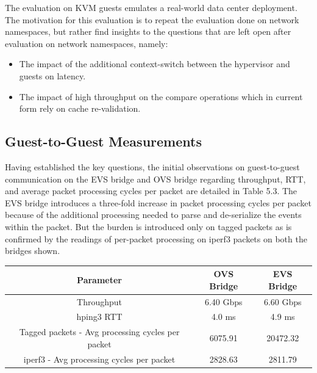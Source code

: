 The evaluation on KVM guests emulates a real-world data center deployment. The motivation for this evaluation is to repeat the evaluation done on network namespaces, but rather find insights to the questions that are left open after evaluation on network namespaces, namely:
\begin{itemize}
 \item The impact of the additional context-switch between the hypervisor and guests on latency. 
 \item The impact of high throughput on the compare operations which in current form rely on cache re-validation. 
\end{itemize}

\subsection{Guest-to-Guest Measurements}

Having established the key questions, the initial observations on guest-to-guest communication on the EVS bridge and OVS bridge regarding throughput, RTT, and average packet processing cycles per packet are detailed in Table 5.3. The EVS bridge introduces a three-fold increase in packet processing cycles per packet because of the additional processing needed to parse and de-serialize the events within the packet. But the burden is introduced only on tagged packets as is confirmed by the readings of per-packet processing on iperf3 packets on both the bridges shown. \newline \newline



\begin{center}
  \label{tab:title} 
 \begin{tabular}{ |c|c|c| }
  \hline
  \textbf{Parameter} &  \textbf{OVS Bridg}e &  \textbf{EVS Bridge} \\\toprule
  \hline
  Throughput  & 6.40 Gbps & 6.60 Gbps  \\
  \hline 
  hping3 RTT  & 4.0 ms & 4.9 ms \\
  \hline  
  Tagged packets - Avg processing 
  cycles per packet  &  6075.91 & 20472.32  \\ 
  \hline
  \hline  
  iperf3 - Avg processing 
  cycles per packet   &  2828.63 & 2811.79 \\\bottomrule  
 \end{tabular}
\end{center} 


